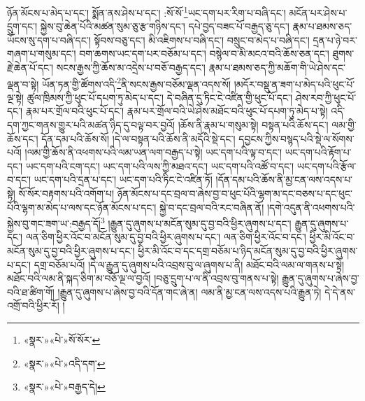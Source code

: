 ཉོན་མོངས་པ་མེད་པ་དང་། སྨོན་ནས་ཤེས་པ་དང་། :སོ་སོ་\footnote{«སྣར་»«པེ་»སོ་སོར་}ཡང་དག་པར་རིག་པ་བཞི་དང་། མངོན་པར་ཤེས་པ་དྲུག་དང་། སྐྱེས་བུ་ཆེན་པོའི་མཚན་སུམ་ཅུ་རྩ་གཉིས་དང་། དཔེ་བྱད་བཟང་པོ་བརྒྱད་ཅུ་དང་། རྣམ་པ་ཐམས་ཅད་ཡོངས་སུ་དག་པ་བཞི་དང་། སྟོབས་བཅུ་དང་། མི་འཇིགས་པ་བཞི་དང་། བསྲུང་བ་མེད་པ་བཞི་དང་། དྲན་པ་ཉེ་བར་གཞག་པ་གསུམ་དང་། བག་ཆགས་ཡང་དག་པར་བཅོམ་པ་དང་། བསྙེལ་བ་མི་མངའ་བའི་ཆོས་ཅན་དང་། ཐུགས་རྗེ་ཆེན་པོ་དང་། སངས་རྒྱས་ཀྱི་ཆོས་མ་འདྲེས་པ་བཅོ་བརྒྱད་དང་། རྣམ་པ་ཐམས་ཅད་ཀྱི་མཆོག་གི་ཡེ་ཤེས་དང་ལྡན་བ་སྟེ། ཡོན་ཏན་གྱི་ཚོགས་འདི་\footnote{«སྣར་»«པེ་»འདི་དག་}ནི་སངས་རྒྱས་བཅོམ་ལྡན་འདས་སོ། །མདོར་བསྡུ་ན་ཟག་པ་མེད་པའི་ཕུང་པོ་ལྔ་སྟེ། ཚུལ་ཁྲིམས་ཀྱི་ཕུང་པོ་དཔག་ཏུ་མེད་པ་དང་། དེ་བཞིན་དུ་ཏིང་ངེ་འཛིན་གྱི་ཕུང་པོ་དང་། ཤེས་རབ་ཀྱི་ཕུང་པོ་དང་། རྣམ་པར་གྲོལ་བའི་ཕུང་པོ་དང་། རྣམ་པར་གྲོལ་བའི་ཡེ་ཤེས་མཐོང་བའི་ཕུང་པོ་དཔག་ཏུ་མེད་པ་སྟེ། འདི་དག་ཀྱང་གནས་གྱུར་པའི་མཚན་ཉིད་དུ་བལྟ་བར་བྱའོ། །ཆོས་ནི་རྣམ་པ་གསུམ་སྟེ། བསྟན་པའི་ཆོས་དང་། ལམ་གྱི་ཆོས་དང་། དོན་དམ་པའི་ཆོས་སོ། །དེ་ལ་བསྟན་པའི་ཆོས་ནི་མདོའི་སྡེ་དང་། དབྱངས་ཀྱིས་བསྙད་པའི་སྡེ་ལ་སོགས་པའོ། །ལམ་གྱི་ཆོས་ནི་འཕགས་པའི་ལམ་ཡན་ལག་བརྒྱད་པ་སྟེ། ཡང་དག་པའི་ལྟ་བ་དང་། ཡང་དག་པའི་རྟོག་པ་དང་། ཡང་དག་པའི་ངག་དང་། ཡང་དག་པའི་ལས་ཀྱི་མཐའ་དང་། ཡང་དག་པའི་འཚོ་བ་དང་། ཡང་དག་པའི་རྩོལ་བ་དང་། ཡང་དག་པའི་དྲན་པ་དང་། ཡང་དག་པའི་ཏིང་ངེ་འཛིན་ཏོ། །དོན་དམ་པའི་ཆོས་ནི་མྱ་ངན་ལས་འདས་པ་སྟེ། སོ་སོར་བརྟགས་པའི་འགོག་པ། ཉོན་མོངས་པ་དང་བྲལ་བ་ཞེས་བྱ་བ་ཕུང་པོའི་ལྷག་མ་དང་བཅས་པ་དང་ཕུང་པོའི་ལྷག་མ་མེད་པ་ལས་དང་ཉོན་མོངས་པ་དང་། སྐྱེ་བ་དང་བྲལ་བའི་རང་བཞིན་ནོ། །དགེ་འདུན་ནི་འཕགས་པའི་སྐྱེས་བུ་གང་ཟག་ཡ་:བརྒྱད་དོ།\footnote{«སྣར་»«པེ་»བརྒྱད་དེ།} །རྒྱུན་དུ་ཞུགས་པ་མངོན་སུམ་དུ་བྱ་བའི་ཕྱིར་ཞུགས་པ་དང་། རྒྱུན་དུ་ཞུགས་པ་དང་། ལན་ཅིག་ཕྱིར་འོང་བ་མངོན་སུམ་དུ་བྱ་བའི་ཕྱིར་ཞུགས་པ་དང་། ལན་ཅིག་ཕྱིར་འོང་བ་དང་། ཕྱིར་མི་འོང་བ་མངོན་སུམ་དུ་བྱ་བའི་ཕྱིར་ཞུགས་པ་དང་། ཕྱིར་མི་འོང་བ་དང་དགྲ་བཅོམ་པ་ཉིད་མངོན་སུམ་དུ་བྱ་བའི་ཕྱིར་ཞུགས་པ་དང་། དགྲ་བཅོམ་པའོ། །དེ་ལ་རྒྱུན་དུ་ཞུགས་པའི་འབྲས་བུ་ལ་ཞུགས་པ་ནི། མཐོང་བའི་ལམ་ལ་གནས་པ་སྟེ། མཐོང་བའི་ལམ་ནི་སྐད་ཅིག་མ་བཅོ་ལྔ་ལ་བྱའོ། །བཅུ་དྲུག་པ་ལ་ནི་འབྲས་བུ་གནས་པ་སྟེ། རྒྱུན་དུ་ཞུགས་པ་ཞེས་བྱ་བའི་ཐ་ཚིག་གོ། །རྒྱུན་དུ་ཞུགས་པ་ཞེས་བྱ་བའི་དོན་གང་ཞེ་ན། ལམ་ནི་མྱ་ངན་ལས་འདས་པའི་རྒྱུན་ཏེ། དེ་དེ་ནས་འགྲོ་བའི་ཕྱིར་རོ། །
